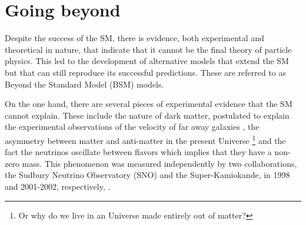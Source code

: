 
\section{Going beyond}
\label{section:BSM}
%
%

Despite the success of the SM, there is evidence, both experimental and theoretical in nature, that indicate that it cannot be the final theory of particle physics. This led to the development of alternative models that extend the SM but that can still reproduce its successful predictions. These are referred to as Beyond the Standard Model (BSM) models. 

On the one hand, there are several pieces of experimental evidence that the SM cannot explain. These include the nature of dark matter, postulated to explain the experimental observations of the velocity of far away galaxies \cite{DM}, the asymmetry between matter and anti-matter in the present Universe \footnote{Or why do we live in an Universe made entirely out of matter?} and the fact the neutrinos oscillate between flavors which implies that they have a non-zero mass. This phenomenon was measured independently by two collaborations, the Sudbury Neutrino Observatory (SNO) and the Super-Kamiokande, in 1998 and 2001-2002, respectively, \cite{neutrinosSuperK,neutrinosSNO1,neutrinosSNO2}.


